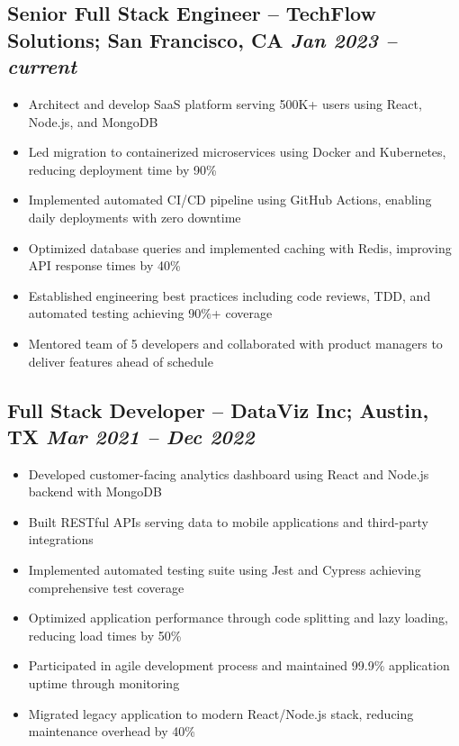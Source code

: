 \documentclass[a4paper,10pt]{article}
\begin{document}
    \subsection*{Senior Full Stack Engineer – TechFlow Solutions; San Francisco, CA \hfill \textit{Jan 2023 – current}}
    \vspace{-0.8em}
    \begin{itemize}[leftmargin=0.2cm, itemsep=0pt, label=--]
        \item Architect and develop SaaS platform serving 500K+ users using React, Node.js, and MongoDB
        \item Led migration to containerized microservices using Docker and Kubernetes, reducing deployment time by 90\%
        \item Implemented automated CI/CD pipeline using GitHub Actions, enabling daily deployments with zero downtime
        \item Optimized database queries and implemented caching with Redis, improving API response times by 40\%
        \item Established engineering best practices including code reviews, TDD, and automated testing achieving 90\%+ coverage
        \item Mentored team of 5 developers and collaborated with product managers to deliver features ahead of schedule
    \end{itemize}

    \subsection*{Full Stack Developer – DataViz Inc; Austin, TX \hfill \textit{Mar 2021 – Dec 2022}}
    \vspace{-0.8em}
    \begin{itemize}[leftmargin=0.2cm, itemsep=0pt, label=--]
        \item Developed customer-facing analytics dashboard using React and Node.js backend with MongoDB
        \item Built RESTful APIs serving data to mobile applications and third-party integrations
        \item Implemented automated testing suite using Jest and Cypress achieving comprehensive test coverage
        \item Optimized application performance through code splitting and lazy loading, reducing load times by 50\%
        \item Participated in agile development process and maintained 99.9\% application uptime through monitoring
        \item Migrated legacy application to modern React/Node.js stack, reducing maintenance overhead by 40\%
    \end{itemize}
\end{document}
